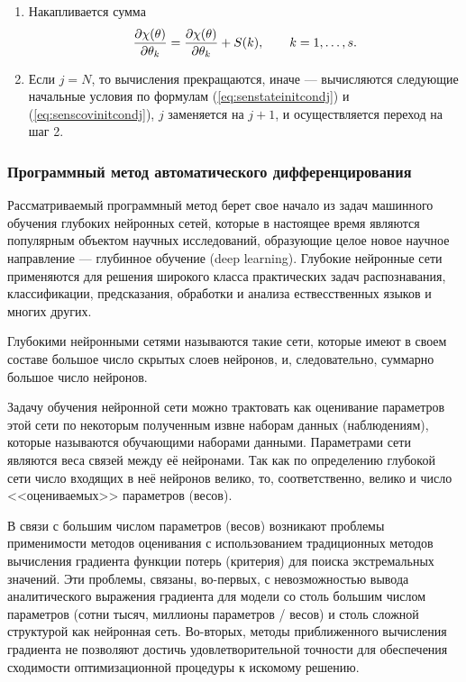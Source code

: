 \documentclass[a4paper,14pt]{extarticle}
\let\oldref\ref
\renewcommand{\ref}[1]{(\oldref{#1})}
\begin{document}
\begin{enumerate}
\item Накапливается сумма
\[
	\frac{\partial \chi(\theta)}{\partial \theta_k} = \frac{\partial \chi(\theta)}{\partial \theta_k} + S(k),
		\qquad k = 1, \ldots, s.
\]

\item Если $j = N$, то вычисления прекращаются, иначе --- вычисляются следующие
начальные условия по формулам \ref{eq:senstateinitcondj} и
\ref{eq:senscovinitcondj}, $j$ заменяется на $j + 1$, и осуществляется переход
на шаг 2.

\end{enumerate}

\subsubsection{Программный метод автоматического дифференцирования}

Рассматриваемый программный метод берет свое начало из задач машинного обучения
глубоких нейронных сетей, которые в настоящее время являются популярным
объектом научных исследований, образующие целое новое научное направление ---
глубинное обучение (deep learning). Глубокие нейронные сети применяются для
решения широкого класса практических задач распознавания, классификации,
предсказания, обработки и анализа ествесственных языков и многих других.

Глубокими нейронными сетями называются такие сети, которые имеют в своем
составе большое число скрытых слоев нейронов, и, следовательно, суммарно
большое число нейронов.

Задачу обучения нейронной сети можно трактовать как оценивание параметров этой
сети по некоторым полученным извне наборам данных (наблюдениям), которые
называются обучающими наборами данными. Параметрами сети являются веса связей
между её нейронами. Так как по определению глубокой сети число входящих в неё
нейронов велико, то, соответственно, велико и число <<оцениваемых>> параметров
(весов).

В связи с большим числом параметров (весов) возникают проблемы применимости
методов оценивания с использованием традиционных методов вычисления градиента
функции потерь (критерия) для поиска экстремальных значений. Эти проблемы,
связаны, во-первых, с невозможностью вывода аналитического выражения градиента
для модели со столь большим числом параметров (сотни тысяч, миллионы параметров
/ весов) и столь сложной структурой как нейронная сеть. Во-вторых, методы
приближенного вычисления градиента не позволяют достичь удовлетворительной
точности для обеспечения сходимости оптимизационной процедуры к искомому
решению.
\end{document}
